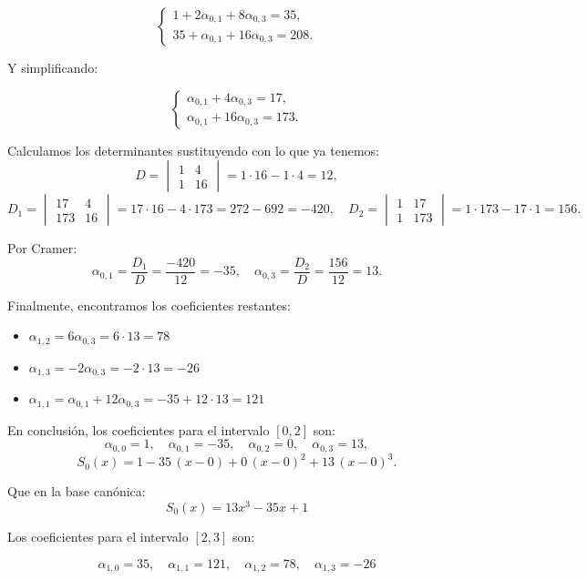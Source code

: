\documentclass{article}
\begin{document}
$$
\begin{cases}
1 + 2\alpha_{0,1} + 8\alpha_{0,3} = 35,\\
35 + \alpha_{0,1} + 16\alpha_{0,3} = 208.
\end{cases}
$$

Y simplificando:

$$
\begin{cases}
\alpha_{0,1} + 4\alpha_{0,3} = 17, \\
\alpha_{0,1} + 16\alpha_{0,3} = 173.
\end{cases}
$$

Calculamos los determinantes sustituyendo con lo que ya tenemos:
$$
D = \begin{vmatrix}
1 & 4 \\
1 & 16
\end{vmatrix}
= 1\cdot16 - 1\cdot4 = 12,
$$
$$
D_{1} = \begin{vmatrix}
17 & 4 \\
173 & 16
\end{vmatrix}
= 17\cdot16 - 4\cdot173 = 272 - 692 = -420,
\quad
D_{2} = \begin{vmatrix}
1 & 17 \\
1 & 173
\end{vmatrix}
= 1\cdot173 - 17\cdot1 = 156.
$$

Por Cramer:
$$
\alpha_{0,1} = \frac{D_{1}}{D} = \frac{-420}{12} = -35,
\quad
\alpha_{0,3} = \frac{D_{2}}{D} = \frac{156}{12} = 13.
$$

Finalmente, encontramos los coeficientes restantes:
\begin{itemize}
    \item \(\alpha_{1,2} = 6\alpha_{0,3} = 6\cdot13 = 78\)
    \item \(\alpha_{1,3} = -2\alpha_{0,3} = -2\cdot13 = -26\)
    \item \(\alpha_{1,1} = \alpha_{0,1} + 12\alpha_{0,3} = -35 + 12\cdot13 = 121\)
\end{itemize}

En conclusión, los coeficientes para el intervalo \([0,2]\) son:
$$
\alpha_{0,0} = 1,\quad \alpha_{0,1} = -35,\quad \alpha_{0,2} = 0,\quad \alpha_{0,3} = 13,
$$
$$
S_{0}(x) = 1 - 35\,(x-0) + 0\,(x-0)^{2} + 13\,(x-0)^{3}.
$$

Que en la base canónica:
$$ \boxed{S_0(x) = 13x^3 - 35x + 1} $$

Los coeficientes para el intervalo $[2, 3]$ son:


$$\alpha_{1,0} = 35, \quad \alpha_{1,1} = 121, \quad \alpha_{1,2} = 78, \quad \alpha_{1,3} = -26$$
\end{document}
